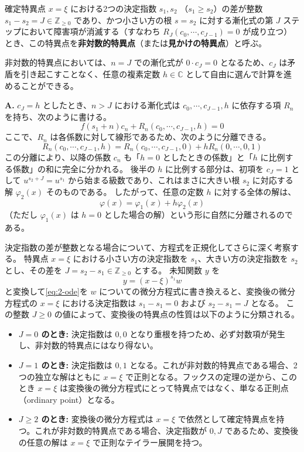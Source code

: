 \begin{definition}\label{def:non_logarithmic}
確定特異点 $x=\xi$ における2つの決定指数 $s_{1}, s_{2}$ （$s_{1} \ge s_{2}$）の差が整数 $s_{1} - s_{2} = J \in \mathbb{Z}_{\ge 0}$ であり、かつ小さい方の根 $s=s_{2}$ に対する漸化式の第 $J$ ステップにおいて障害項が消滅する（すなわち $R_{J}(c_{0}, \cdots, c_{J-1}) = 0$ が成り立つ）とき、この特異点を\textbf{非対数的特異点}（または\textbf{見かけの特異点}）と呼ぶ。
\end{definition}

非対数的特異点においては、$n=J$ での漸化式が $0 \cdot c_{J} = 0$ となるため、$c_{J}$ は矛盾を引き起こすことなく、任意の複素定数 $h \in \mathbb{C}$ として自由に選んで計算を進めることができる。

\begin{Q}[【核心】小さい方の根 $s_1$ から出発して $c_J = h$ と置いた解は、なぜ大きい方の根 $s_2$ の解 $\varphi_{2}(x)$ を $h$ 倍して足し合わせた形になるのか？]
\textbf{A.} $c_J = h$ としたとき、$n > J$ における漸化式は $c_0, \cdots, c_{J-1}, h$ に依存する項 $R_n$ を持ち、次のように書ける。
\[
f(s_1+n)c_n + R_n(c_0, \cdots, c_{J-1}, h) = 0
\]
ここで、$R_n$ は各係数に対して線形であるため、次のように分離できる。
\[
R_n(c_0, \cdots, c_{J-1}, h) = R_n(c_0, \cdots, c_{J-1}, 0) + h R_n(0, \cdots, 0, 1)
\]
この分離により、以降の係数 $c_n$ も「$h=0$ としたときの係数」と「$h$ に比例する係数」の和に完全に分かれる。
後半の $h$ に比例する部分は、初項を $c_J=1$ として $u^{s_2+J} = u^{s_1}$ から始まる級数であり、これはまさに大きい根 $s_2$ に対応する解 $\varphi_{2}(x)$ そのものである。
したがって、任意の定数 $h$ に対する全体の解は、
\[
\varphi(x) = \varphi_{1}(x) + h\varphi_{2}(x)
\]
（ただし $\varphi_{1}(x)$ は $h=0$ とした場合の解）という形に自然に分離されるのである。
\end{Q}
決定指数の差が整数となる場合について、方程式を正規化してさらに深く考察する。
特異点 $x=\xi$ における小さい方の決定指数を $s_{1}$、大きい方の決定指数を $s_{2}$ とし、その差を $J = s_{2} - s_{1} \in \mathbb{Z}_{\ge 0}$ とする。
未知関数 $y$ を
\[
y = (x-\xi)^{s_{1}} w
\]
と変換して\eqref{eq:2-ode}を $w$ についての微分方程式に書き換えると、変換後の微分方程式の $x=\xi$ における決定指数は $s_{1}-s_{1}=0$ および $s_{2}-s_{1}=J$ となる。
この整数 $J \ge 0$ の値によって、変換後の特異点の性質は以下のように分類される。

\begin{itemize}
    \item \textbf{$J=0$ のとき:} 決定指数は $0, 0$ となり重根を持つため、必ず対数項が発生し、非対数的特異点にはなり得ない。
    \item \textbf{$J=1$ のとき:} 決定指数は $0, 1$ となる。これが非対数的特異点である場合、2つの独立な解はともに $x=\xi$ で正則となる。フックスの定理の逆から、このとき $x=\xi$ は変換後の微分方程式にとって特異点ではなく、単なる正則点（ordinary point）となる。
    \item \textbf{$J \ge 2$ のとき:} 変換後の微分方程式は $x=\xi$ で依然として確定特異点を持つ。これが非対数的特異点である場合、決定指数が $0, J$ であるため、変換後の任意の解は $x=\xi$ で正則なテイラー展開を持つ。
\end{itemize}

